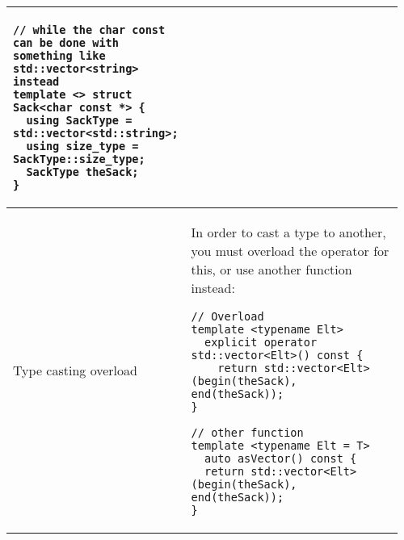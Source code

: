 \documentclass[main.tex,fontsize=8pt,paper=a4,paper=portrait,DIV=calc,]{scrartcl}
\begin{document}
\begin{table}[ht!]
\begin{tabular}{|m{0.2\linewidth}|m{0.755\linewidth}|}
\begin{lstlisting}
// while the char const can be done with something like std::vector<string> instead
template <> struct Sack<char const *> {
  using SackType = std::vector<std::string>;
  using size_type = SackType::size_type;
  SackType theSack;
}
\end{lstlisting}\\
\hline
Type casting overload & 
In order to cast a type to another, you must overload the operator for this, or use another function instead:\newline
\begin{lstlisting}
// Overload 
template <typename Elt>
  explicit operator std::vector<Elt>() const {
    return std::vector<Elt>(begin(theSack), end(theSack));
}

// other function 
template <typename Elt = T>
  auto asVector() const {
  return std::vector<Elt>(begin(theSack), end(theSack));
}
\end{lstlisting}\\
\hline
\end{tabular}
\end{table}
\pagebreak 
\end{document}
